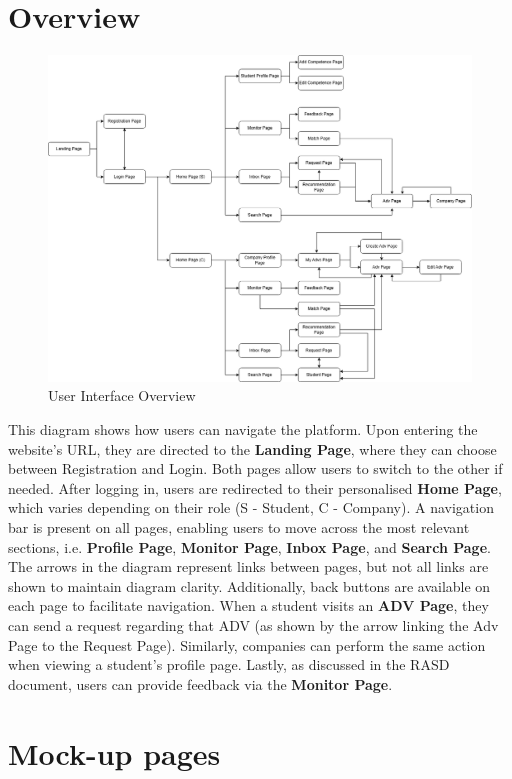 \section{Overview}
\begin{figure}[H]
    \centering
    \includegraphics[width=15cm]{images/ui/DD-UI-Overview.drawio.png}
    \caption{User Interface Overview}
\end{figure}
This diagram shows how users can navigate the platform. Upon entering the website's URL, they are directed to the \textbf{Landing Page}, where they can choose between Registration and Login. Both pages allow users to switch to the other if needed. After logging in, users are redirected to their personalised \textbf{Home Page}, which varies depending on their role (S - Student, C - Company). A navigation bar is present on all pages, enabling users to move across the most relevant sections, i.e. \textbf{Profile Page}, \textbf{Monitor Page}, \textbf{Inbox Page}, and \textbf{Search Page}. The arrows in the diagram represent links between pages, but not all links are shown to maintain diagram clarity. Additionally, back buttons are available on each page to facilitate navigation.
When a student visits an \textbf{ADV Page}, they can send a request regarding that ADV (as shown by the arrow linking the Adv Page to the Request Page). Similarly, companies can perform the same action when viewing a student’s profile page.
Lastly, as discussed in the RASD document, users can provide feedback via the \textbf{Monitor Page}.
\section{Mock-up pages}

